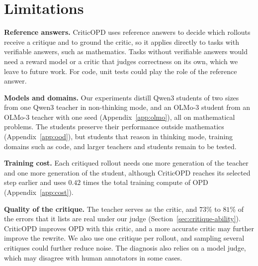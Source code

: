 \documentclass[11pt]{article}
\theoremstyle{remark}
\theoremstyle{plain}
\newcommand{\1}{\mathbf{1}}
\begin{document}
\section*{Limitations}

\noindent\textbf{Reference answers.}
CriticOPD uses reference answers to decide which rollouts receive a critique and
to ground the critic, so it applies directly to tasks with verifiable answers,
such as mathematics. Tasks without verifiable answers would need a reward model
or a critic that judges correctness on its own, which we leave to future work.
For code, unit tests could play the role of the reference answer.

\noindent\textbf{Models and domains.}
Our experiments distill Qwen3 students of two sizes from one Qwen3 teacher in
non-thinking mode, and an OLMo-3 student from an OLMo-3 teacher with one seed
(Appendix~\ref{app:olmo}), all on mathematical problems. The students preserve
their performance outside mathematics (Appendix~\ref{app:ood}), but students that
reason in thinking mode, training domains such as code, and larger teachers and
students remain to be tested.

\noindent\textbf{Training cost.}
Each critiqued rollout needs one more generation of the teacher and one more
generation of the student, although
CriticOPD reaches its selected step earlier and uses $0.42$ times the total
training compute of OPD (Appendix~\ref{app:cost}).

\noindent\textbf{Quality of the critique.}
The teacher serves as the critic, and $73\%$ to $81\%$ of the errors that it
lists are real under our judge (Section~\ref{sec:critique-ability}). CriticOPD
improves OPD with this critic, and a more accurate critic may further improve
the rewrite. We also use one critique per rollout, and sampling
several critiques could further reduce noise. The diagnosis also relies on a
model judge, which may disagree with human annotators in some cases.



%


%


\appendix

\end{document}
